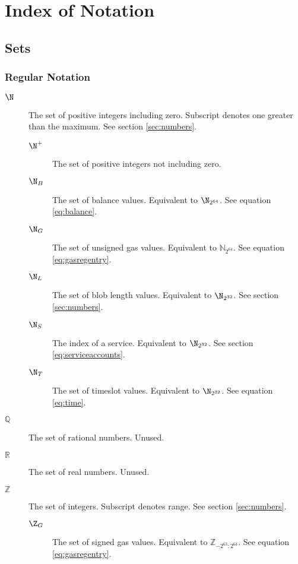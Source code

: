 \section{Index of Notation}\label{sec:definitions}

\subsection{Sets}

\subsubsection{Regular Notation}
\begin{description}
  \item[$\N$] The set of positive integers including zero. Subscript denotes one greater than the maximum. See section \ref{sec:numbers}.
  \begin{description}
    \item[$\N^+$] The set of positive integers not including zero.
    \item[$\N_B$] The set of balance values. Equivalent to $\N_{2^{64}}$. See equation \ref{eq:balance}.
    \item[$\N_G$] The set of unsigned gas values. Equivalent to $\mathbb{N}_{2^{64}}$. See equation \ref{eq:gasregentry}.
    \item[$\N_L$] The set of blob length values. Equivalent to $\N_{2^{32}}$. See section \ref{sec:numbers}.
    \item[$\N_S$] The index of a service. Equivalent to $\N_{2^{32}}$. See section \ref{eq:serviceaccounts}.
    \item[$\N_T$] The set of timeslot values. Equivalent to $\N_{2^{32}}$. See equation \ref{eq:time}.
  \end{description}
  \item[$\mathbb{Q}$] The set of rational numbers. Unused.
  \item[$\mathbb{R}$] The set of real numbers. Unused.
  \item[$\mathbb{Z}$] The set of integers. Subscript denotes range. See section \ref{sec:numbers}.
  \begin{description}
    \item[$\Z_G$] The set of signed gas values. Equivalent to $\mathbb{Z}_{-2^{63}:2^{63}}$. See equation \ref{eq:gasregentry}.
  \end{description}
\end{description}

